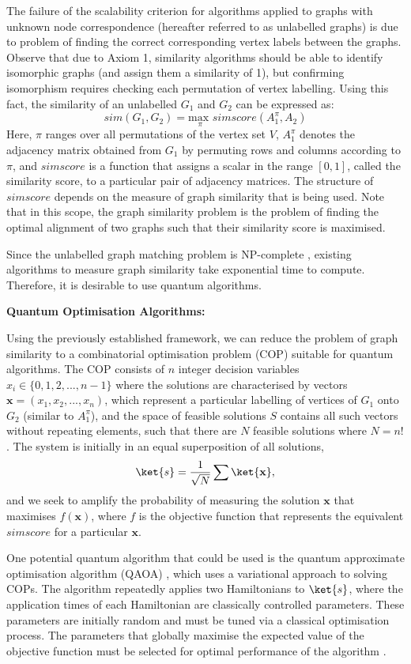 The failure of the scalability criterion for algorithms applied to graphs with unknown node correspondence (hereafter referred to as unlabelled graphs) is due to problem of finding the correct corresponding vertex labels between the graphs. Observe that due to Axiom 1, similarity algorithms should be able to identify isomorphic graphs (and assign them a similarity of 1), but confirming isomorphism requires checking each permutation of vertex labelling. Using this fact, the similarity of an unlabelled $G_{1}$ and $G_{2}$ can be expressed as:
$$
sim(G_{1},G_{2})=\underset{\pi}{\text{max }}simscore(A_{1}^{\pi},A_{2})
$$
Here, $\pi$ ranges over all permutations of the vertex set $V$, $A_{1}^{\pi}$ denotes the adjacency matrix obtained from $G_{1}$ by permuting rows and columns according to $\pi$, and $simscore$ is a function that assigns a scalar in the range $[0,1]$, called the similarity score, to a particular pair of adjacency matrices. The structure of $simscore$ depends on the measure of graph similarity that is being used. Note that in this scope, the graph similarity problem is the problem of finding the optimal alignment of two graphs such that their similarity score is maximised.

Since the unlabelled graph matching problem is NP-complete \cite{how_similar}, existing algorithms to measure graph similarity take exponential time to compute. Therefore, it is desirable to use quantum algorithms.

\textbf{Quantum Optimisation Algorithms:}

Using the previously established framework, we can reduce the problem of graph similarity to a combinatorial optimisation problem (COP) suitable for quantum algorithms. The COP consists of $n$ integer decision variables $x_{i}\in \{0,1,2,...,n-1 \}$ where the solutions are characterised by vectors $\mathbf{x}=(x_{1},x_{2},...,x_{n})$, which represent a particular labelling of vertices of $G_{1}$ onto $G_{2}$ (similar to $A_{1}^{\pi}$), and the space of feasible solutions $S$ contains all such vectors without repeating elements, such that there are $N$ feasible solutions where $N=n!$.  The system is initially in an equal superposition of all solutions,
$$
\ket{s} = \frac{1}{\sqrt{N}} \sum \ket{\mathbf{x}},
$$
and we seek to amplify the probability of measuring the solution $\mathbf{x}$ that maximises $f(\mathbf{x})$, where $f$ is the objective function that represents the equivalent $simscore$ for a particular $\mathbf{x}$.

One potential quantum algorithm that could be used is the quantum approximate optimisation algorithm (QAOA) \cite{QAOA}, which uses a variational approach to solving COPs. The algorithm repeatedly applies two Hamiltonians to $\ket{s}$, where the application times of each Hamiltonian are classically controlled parameters. These parameters are initially random and must be tuned via a classical optimisation process. The parameters that globally maximise the expected value of the objective function must be selected for optimal performance of the algorithm \cite{QAOA-review}.

